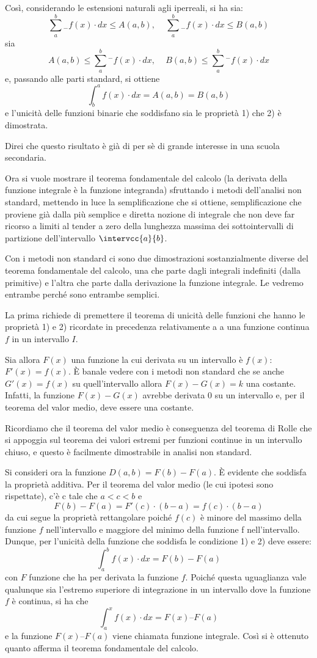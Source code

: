 Così, 
considerando le estensioni naturali agli iperreali, si ha sia:
\[\sum_a^b {}_{-}f(x) \cdot dx \le A(a,b) \text{, } \quad
  \sum_a^b {}_{-}f(x) \cdot dx \le B(a,b)\]
sia 
\[A(a,b) \le \sum_a^b {}^{-}f(x) \cdot dx \text{, } \quad
  B(a,b) \le \sum_a^b {}^{-}f(x) \cdot dx\] 
e, passando alle parti standard, si ottiene 
\[\int_b^a f(x) \cdot dx = A(a,b) = B(a,b)\]
e l'unicità delle funzioni binarie che soddisfano sia le proprietà 1) che 2) 
è dimostrata. 

Direi che questo risultato è già di per sè di grande interesse in una scuola 
secondaria. 

Ora si vuole mostrare il teorema fondamentale del calcolo (la derivata della 
funzione integrale è la funzione integranda) sfruttando i 
metodi dell'analisi non standard, mettendo in luce la semplificazione che si 
ottiene, semplificazione che proviene già dalla più semplice e diretta 
nozione di integrale che non deve far ricorso a limiti al tender a zero della 
lunghezza massima dei sottointervalli di partizione dell'intervallo 
\(\intervcc{a}{b}\). 

Con i metodi non standard ci sono due dimostrazioni sostanzialmente diverse 
del teorema fondamentale del calcolo, una che parte dagli integrali indefiniti 
(dalla primitive) e l'altra che parte dalla derivazione la funzione integrale. 
Le vedremo entrambe perché sono entrambe semplici. 

La prima richiede di 
premettere il teorema di unicità delle funzioni che hanno le proprietà 1) e 
2) ricordate in precedenza relativamente a a una funzione continua \(f\) in 
un intervallo \(I\). 

Sia allora \(F(x)\) una funzione la cui derivata su un intervallo è 
\(f(x)\):  
\(F'(x) = f(x)\). 
È banale vedere con i metodi non standard che se anche 
\(G'(x) = f(x)\) 
su quell'intervallo allora \(F(x) - G(x) = k\) una costante. 
Infatti, la funzione 
\(F(x) - G(x)\) avrebbe derivata 0 su un intervallo e, per il teorema 
del valor medio, deve essere una costante. 

Ricordiamo che il teorema del valor medio è conseguenza del teorema
di Rolle che si appoggia sul teorema dei valori estremi per funzioni continue 
in un intervallo chiuso, e questo è facilmente dimostrabile in analisi non 
standard. 

Si consideri ora la funzione 
\(D(a,b) = F(b)-F(a)\). 
È evidente che soddisfa la proprietà additiva. Per il teorema 
del valor medio (le cui ipotesi sono rispettate), c'è c tale che 
\(a < c < b\) 
e 
\[F(b)-F(a) = F'(c)\cdot(b - a) = f(c)\cdot(b - a)\]
da cui segue la proprietà rettangolare poiché \(f(c)\) è minore del massimo 
della funzione \(f\) 
nell'intervallo e maggiore del minimo della funzione f nell'intervallo.
Dunque, 
per l'unicità della funzione che soddisfa le condizione 1) e 2) deve essere:
\[\int_a^b f(x) \cdot dx = F(b)-F(a)\]
con \(F\) funzione che ha per derivata la funzione \(f\). 
Poiché questa uguaglianza vale qualunque sia l'estremo superiore di 
integrazione in un intervallo dove la funzione \(f\) è continua, si ha che
\[\int_a^x f(x) \cdot dx = F(x) – F(a)\]
e la funzione \(F(x) – F(a)\) viene chiamata funzione integrale.
Così si è ottenuto quanto afferma il teorema fondamentale del
calcolo.

